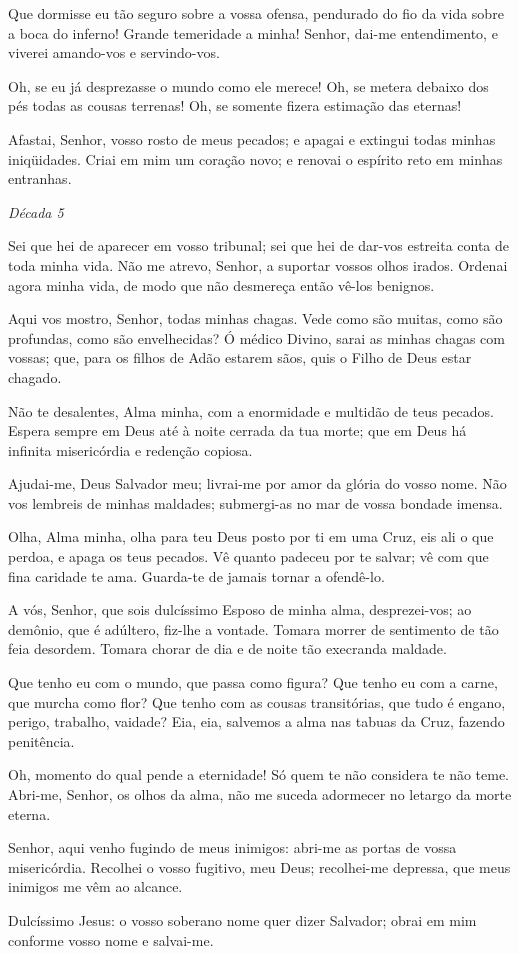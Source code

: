Que dormisse eu tão seguro sobre a vossa ofensa, pendurado do fio da vida sobre a boca do inferno! Grande temeridade a minha! Senhor, dai-me entendimento, e viverei amando-vos e servindo-vos.

Oh, se eu já desprezasse o mundo como ele merece! Oh, se metera debaixo dos pés todas as cousas terrenas! Oh, se somente fizera estimação das eternas!

Afastai, Senhor, vosso rosto de meus pecados; e apagai e extingui todas minhas iniqüidades. Criai em mim um coração novo; e renovai o espírito reto em minhas entranhas.

\begin{nscenter} \emph{Década 5} \end{nscenter}

Sei que hei de aparecer em vosso tribunal; sei que hei de dar-vos estreita conta de toda minha vida. Não me atrevo, Senhor, a suportar vossos olhos irados. Ordenai agora minha vida, de modo que não desmereça então vê-los benignos.

Aqui vos mostro, Senhor, todas minhas chagas. Vede como são muitas, como são profundas, como são envelhecidas? Ó médico Divino, sarai as minhas chagas com vossas; que, para os filhos de Adão estarem sãos, quis o Filho de Deus estar chagado.

Não te desalentes, Alma minha, com a enormidade e multidão de teus pecados. Espera sempre em Deus até à noite cerrada da tua morte; que em Deus há infinita misericórdia e redenção copiosa.

Ajudai-me, Deus Salvador meu; livrai-me por amor da glória do vosso nome. Não vos lembreis de minhas maldades; submergi-as no mar de vossa bondade imensa.

Olha, Alma minha, olha para teu Deus posto por ti em uma Cruz, eis ali o que perdoa, e apaga os teus pecados. Vê quanto padeceu por te salvar; vê com que fina caridade te ama. Guarda-te de jamais tornar a ofendê-lo.

A vós, Senhor, que sois dulcíssimo Esposo de minha alma, desprezei-vos; ao demônio, que é adúltero, fiz-lhe a vontade. Tomara morrer de sentimento de tão feia desordem. Tomara chorar de dia e de noite tão execranda maldade.

Que tenho eu com o mundo, que passa como figura? Que tenho eu com a carne, que murcha como flor? Que tenho com as cousas transitórias, que tudo é engano, perigo, trabalho, vaidade? Eia, eia, salvemos a alma nas tabuas da Cruz, fazendo penitência.

Oh, momento do qual pende a eternidade! Só quem te não considera te não teme. Abri-me, Senhor, os olhos da alma, não me suceda adormecer no letargo da morte eterna.

Senhor, aqui venho fugindo de meus inimigos: abri-me as portas de vossa misericórdia. Recolhei o vosso fugitivo, meu Deus; recolhei-me depressa, que meus inimigos me vêm ao alcance.

Dulcíssimo Jesus: o vosso soberano nome quer dizer Salvador; obrai em mim conforme vosso nome e salvai-me.
